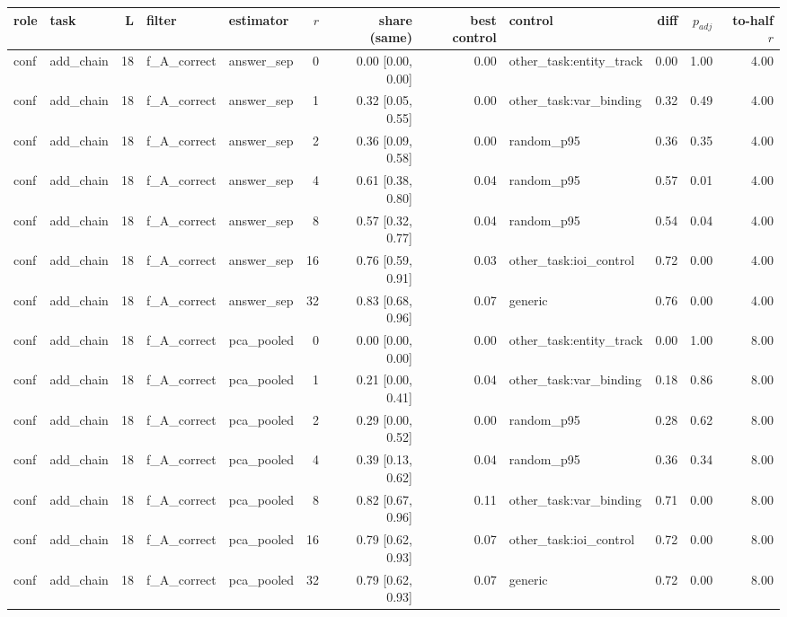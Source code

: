 \begin{tabular}{llrllrrrlrrr}
\toprule
role & task & L & filter & estimator & $r$ & share (same) & best control & control & diff & $p_{adj}$ & to-half $r$ \\
\midrule
conf & add\_chain & 18 & f\_A\_correct & answer\_sep & 0 & 0.00 [0.00, 0.00] & 0.00 & other\_task:entity\_track & 0.00 & 1.00 & 4.00 \\
conf & add\_chain & 18 & f\_A\_correct & answer\_sep & 1 & 0.32 [0.05, 0.55] & 0.00 & other\_task:var\_binding & 0.32 & 0.49 & 4.00 \\
conf & add\_chain & 18 & f\_A\_correct & answer\_sep & 2 & 0.36 [0.09, 0.58] & 0.00 & random\_p95 & 0.36 & 0.35 & 4.00 \\
conf & add\_chain & 18 & f\_A\_correct & answer\_sep & 4 & 0.61 [0.38, 0.80] & 0.04 & random\_p95 & 0.57 & 0.01 & 4.00 \\
conf & add\_chain & 18 & f\_A\_correct & answer\_sep & 8 & 0.57 [0.32, 0.77] & 0.04 & random\_p95 & 0.54 & 0.04 & 4.00 \\
conf & add\_chain & 18 & f\_A\_correct & answer\_sep & 16 & 0.76 [0.59, 0.91] & 0.03 & other\_task:ioi\_control & 0.72 & 0.00 & 4.00 \\
conf & add\_chain & 18 & f\_A\_correct & answer\_sep & 32 & 0.83 [0.68, 0.96] & 0.07 & generic & 0.76 & 0.00 & 4.00 \\
conf & add\_chain & 18 & f\_A\_correct & pca\_pooled & 0 & 0.00 [0.00, 0.00] & 0.00 & other\_task:entity\_track & 0.00 & 1.00 & 8.00 \\
conf & add\_chain & 18 & f\_A\_correct & pca\_pooled & 1 & 0.21 [0.00, 0.41] & 0.04 & other\_task:var\_binding & 0.18 & 0.86 & 8.00 \\
conf & add\_chain & 18 & f\_A\_correct & pca\_pooled & 2 & 0.29 [0.00, 0.52] & 0.00 & random\_p95 & 0.28 & 0.62 & 8.00 \\
conf & add\_chain & 18 & f\_A\_correct & pca\_pooled & 4 & 0.39 [0.13, 0.62] & 0.04 & random\_p95 & 0.36 & 0.34 & 8.00 \\
conf & add\_chain & 18 & f\_A\_correct & pca\_pooled & 8 & 0.82 [0.67, 0.96] & 0.11 & other\_task:var\_binding & 0.71 & 0.00 & 8.00 \\
conf & add\_chain & 18 & f\_A\_correct & pca\_pooled & 16 & 0.79 [0.62, 0.93] & 0.07 & other\_task:ioi\_control & 0.72 & 0.00 & 8.00 \\
conf & add\_chain & 18 & f\_A\_correct & pca\_pooled & 32 & 0.79 [0.62, 0.93] & 0.07 & generic & 0.72 & 0.00 & 8.00 \\

\end{tabular}
